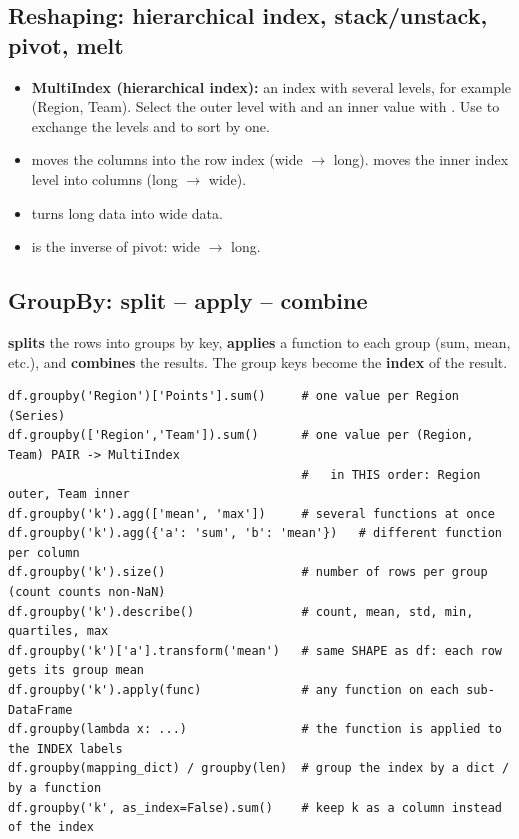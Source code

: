 \subsection{Reshaping: hierarchical index, stack/unstack, pivot, melt}
\begin{itemize}
  \item \textbf{MultiIndex (hierarchical index):} an index with several levels, for example (Region, Team). Select the outer level with  and an inner value with . Use  to exchange the levels and  to sort by one.
  \item {} moves the columns into the row index (wide $\to$ long).  moves the inner index level into columns (long $\to$ wide).
  \item {} turns long data into wide data.
  \item {} is the inverse of pivot: wide $\to$ long.
\end{itemize}

\subsection{GroupBy: split -- apply -- combine}
\begin{idea}
 \textbf{splits} the rows into groups by key, \textbf{applies} a function to each group (sum, mean, etc.), and \textbf{combines} the results. The group keys become the \textbf{index} of the result.
\end{idea}
\begin{codebox}
\begin{Verbatim}
df.groupby('Region')['Points'].sum()     # one value per Region (Series)
df.groupby(['Region','Team']).sum()      # one value per (Region, Team) PAIR -> MultiIndex
                                         #   in THIS order: Region outer, Team inner
df.groupby('k').agg(['mean', 'max'])     # several functions at once
df.groupby('k').agg({'a': 'sum', 'b': 'mean'})   # different function per column
df.groupby('k').size()                   # number of rows per group (count counts non-NaN)
df.groupby('k').describe()               # count, mean, std, min, quartiles, max
df.groupby('k')['a'].transform('mean')   # same SHAPE as df: each row gets its group mean
df.groupby('k').apply(func)              # any function on each sub-DataFrame
df.groupby(lambda x: ...)                # the function is applied to the INDEX labels
df.groupby(mapping_dict) / groupby(len)  # group the index by a dict / by a function
df.groupby('k', as_index=False).sum()    # keep k as a column instead of the index
\end{Verbatim}
\end{codebox}

